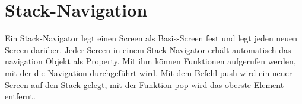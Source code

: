 \section{Stack-Navigation}
Ein Stack-Navigator legt einen Screen als Basis-Screen fest und legt jeden neuen Screen darüber.
Jeder Screen in einem Stack-Navigator erhält automatisch das navigation Objekt als Property. Mit
ihm können Funktionen aufgerufen werden, mit der die Navigation durchgeführt wird. Mit dem Befehl
push wird ein neuer Screen auf den Stack gelegt, mit der Funktion pop wird das oberste Element
entfernt.




